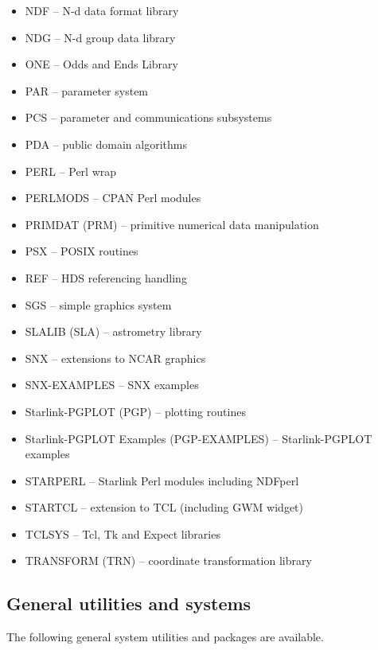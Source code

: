 \documentclass[twoside,11pt]{article}
\newcommand{\xlabel}[1]{}
\renewcommand{\_}{\texttt{\symbol{95}}}
\begin{document}
\begin{itemize}
\item NDF -- N-d data format library
\item NDG -- N-d group data library
\item ONE -- Odds and Ends Library
\item PAR -- parameter system
\item PCS -- parameter and communications subsystems
\item PDA -- public domain algorithms
\item PERL -- Perl wrap
\item PERLMODS -- CPAN Perl modules
\item PRIMDAT (PRM) -- primitive numerical data manipulation
\item PSX -- POSIX routines
\item REF -- HDS referencing handling
\item SGS -- simple graphics system
\item SLALIB (SLA) -- astrometry library
\item SNX -- extensions to NCAR graphics
\item SNX-EXAMPLES -- SNX examples
\item Starlink-PGPLOT (PGP) -- plotting routines
\item Starlink-PGPLOT Examples (PGP-EXAMPLES) -- Starlink-PGPLOT examples
\item STARPERL -- Starlink Perl modules including NDFperl
\item STARTCL -- extension to TCL (including GWM widget)
\item TCLSYS -- Tcl, Tk and Expect libraries
\item TRANSFORM (TRN) -- coordinate transformation library
\end{itemize}

\subsection{\xlabel{general_systems_utilities}General utilities and systems}
\label{general_systems_utilities}

The following general system utilities and packages are available.
\end{document}

